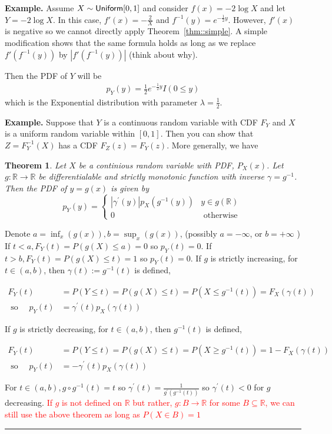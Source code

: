 \documentclass[twoside]{article}
\newcounter{lecnum}
\newcommand{\note}[1]{\textcolor{red}{#1}}
\newtheorem{theorem}{Theorem}[lecnum]
\newenvironment{proof}{{\bf Proof:}}{\hfill\rule{2mm}{2mm}}
\begin{document}
{\bf Example.}
Assume $X\sim {\sf Uniform}[0,1]$ and consider $f(x) = -2\log X$
and let $Y = -2\log X$. 
In this case, $f'(x)  = -\frac{2}{X}$ and $f^{-1}(y) = e^{-\frac{1}{2}y}$.
However, $f'(x)$ is negative so we cannot directly apply Theorem~\ref{thm::simple}.
A simple modification shows that the same formula holds as long as we replace $f'(f^{-1}(y))$
by $|f'(f^{-1}(y))|$ (think about why).

Then the PDF of $Y$ will be 
\begin{align*}
p_Y(y) = \frac{1}{2}e^{-\frac{1}{2}y}I(0\leq y)
\end{align*}
which is the Exponential distribution with parameter $\lambda = \frac{1}{2}$.
 
{\bf Example.}
Suppose that $Y$ is a continuous random variable with CDF $F_Y$
and $X$ is a uniform random variable within $[0,1]$. 
Then you can show that $Z = F_Y^{-1}(X)$ has a CDF $F_Z(z) = F_Y(z)$.
More generally, we have 
\begin{theorem}
    Let $X$ be a continious random variable with PDF, $P_X(x)$. Let $g:\mathbb{R}\rightarrow\mathbb{R}$ be differentialable and strictly monotonic function with inverse $\gamma = g^{-1}$. Then the PDF of $y=g(x)$ is given by $$p_Y(y)= \begin{cases}\left|\gamma^{\prime}(y)\right| p_X\left(g^{-1}(y)\right) & y \in g(\mathbb{R}) \\ 0 & \text { otherwise }\end{cases}$$
\end{theorem}
\begin{proof}
Denote $a=\inf _x(g(x)), b=\sup _x(g(x))$, (possibly $a=-\infty$, or $b=+\infty$ ) If $t<a, F_Y(t)=P(g(X) \leq a)=0$ so $p_Y(t)=0$. If $t>b, F_Y(t)=P(g(X) \leq t)=1$ so $p_Y(t)=0$.
If $g$ is strictly increasing, for $t \in(a, b)$, then $\gamma(t):=g^{-1}(t)$ is defined,

$$
\begin{aligned}
F_Y(t) & =P(Y \leq t)=P(g(X) \leq t)=P\left(X \leq g^{-1}(t)\right)=F_X(\gamma(t)) \\
\text { so } \quad p_Y(t) & =\gamma^{\prime}(t) p_X(\gamma(t))
\end{aligned}
$$


If $g$ is strictly decreasing, for $t \in(a, b)$, then $g^{-1}(t)$ is defined,

$$
\begin{aligned}
F_Y(t) & =P(Y \leq t)=P(g(X) \leq t)=P\left(X \geq g^{-1}(t)\right)=1-F_X(\gamma(t)) \\
\text { so } \quad p_Y(t) & =-\gamma^{\prime}(t) p_X(\gamma(t))
\end{aligned}
$$


For $t \in(a, b), g \circ g^{-1}(t)=t$ so $\gamma^{\prime}(t)=\frac{1}{g^{\prime}\left(g^{-1}(t)\right)}$ so $\gamma^{\prime}(t)<0$ for $g$ decreasing.\newline
\note{If $g$ is not defined on $\mathbb{R}$ but rather, $g:B\rightarrow\mathbb{R}$ for some $B\subseteq\mathbb{R}$, we can still use the above theorem as long as $P(X\in B)=1$} 
\end{proof}
\end{document}
